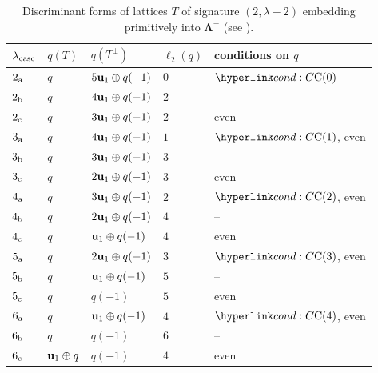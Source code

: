 \begin{center}

\begin{table}
    \caption{Discriminant forms of lattices \(T\) of signature \((2,\lambda -2)\) embedding primitively into {\(\mathbf{\Lambda^-}\)} (see ).}
    \label{tab:T-embedding-in-Lminus}

    \begin{tabular}{lllll}
    \toprule
    \(\lambda_{\rm case}\) & \(q(T)\) & \(q(T^\perp)\) & \(\ell_2(q)\) & conditions on \(q\) \\
    \midrule 
    
    
    \(2_{\rm a}\) & \(q\) & \(5\mathbf{u}_1 \oplus q(-1)\)     & \(0\) & \(\condC{0}\) \\
    \(2_{\rm b}\) & \(q\) & \(4\mathbf{u}_1 \oplus q(-1)\)    & \(2\) & -- \\
    \(2_{\rm c}\) & \(q\) & \(3\mathbf{u}_1 \oplus q(-1)\)   & \(2\) & even \\

    \midrule
    
    \(3_{\rm a}\) & \(q\) & \(4\mathbf{u}_1 \oplus q(-1)\) & \(1\) & \(\condC{1}\), even  \\
    \(3_{\rm b}\) & \(q\) & \(3\mathbf{u}_1 \oplus q(-1)\) & \(3\) & -- \\
    \(3_{\rm c}\) & \(q\) & \(2\mathbf{u}_1 \oplus q(-1)\) & \(3\) & even \\

    \midrule
    
    \(4_{\rm a}\) & \(q\) & \(3\mathbf{u}_1 \oplus q(-1)\) & \(2\) & \(\condC{2}\), even \\
    \(4_{\rm b}\) & \(q\) & \(2\mathbf{u}_1 \oplus q(-1)\) & \(4\) & -- \\
    \(4_{\rm c}\) & \(q\) & \(\mathbf{u}_1 \oplus q(-1)\) & \(4\) & even \\

    \midrule 

    \(5_{\rm a}\) & \(q\) & \(2\mathbf{u}_1 \oplus q(-1)\) & \(3\) & \(\condC{3}\), even \\
    \(5_{\rm b}\) & \(q\) & \(\mathbf{u}_1 \oplus q(-1)\) & \(5\) & --\\
    \(5_{\rm c}\) & \(q\) & \(q(-1)\) & \(5\) & even \\

    \midrule
    
    \(6_{\rm a}\) & \(q\) & \(\mathbf{u}_1 \oplus q(-1)\) & \(4\) & \(\condC{4}\), even \\
    \(6_{\rm b}\) & \(q\) & \(q(-1)\) & \(6\) & -- \\
    \(6_{\rm c}\) & \(\mathbf{u}_1 \oplus q\) & \(q(-1)\) & \(4\) & even \\
    

\end{tabular}
\end{table}
\end{center}
